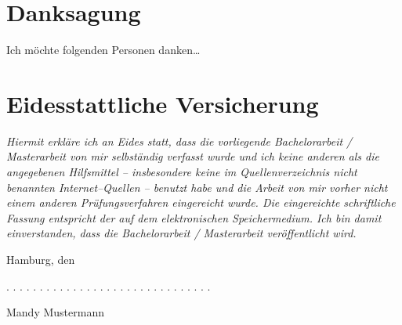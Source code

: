 \documentclass[a4paper,12pt]{article}
\newcommand{\thesistype}{Bachelorarbeit / Masterarbeit}
\newcommand{\thesisauthor}{Mandy Mustermann}
\newcommand{\thesisdate}{}
\begin{document}
\hypertarget{danksagung}{%
\section{Danksagung}\label{danksagung}}

Ich möchte folgenden Personen danken\ldots{}

\newpage

\hypertarget{eidesstattliche-versicherung}{%
\section{Eidesstattliche Versicherung}\label{eidesstattliche-versicherung}}

\emph{Hiermit erkläre ich an Eides statt, dass die vorliegende \thesistype{} von mir selbständig
verfasst wurde und ich keine anderen als die angegebenen Hilfsmittel -- insbesondere
keine im Quellenverzeichnis nicht benannten Internet--Quellen -- benutzt habe und die
Arbeit von mir vorher nicht einem anderen Prüfungsverfahren eingereicht wurde. Die
eingereichte schriftliche Fassung entspricht der auf dem elektronischen Speichermedium.
Ich bin damit einverstanden, dass die \thesistype{} veröffentlicht wird.}
\vspace{1cm}

Hamburg, den \thesisdate{}
\vspace{3cm}

. . . . . . . . . . . . . . . . . . . . . . . . . . . . . . .
\vspace{0.1cm}

\thesisauthor{}

\end{document}
